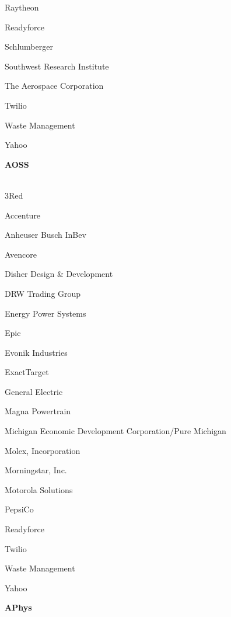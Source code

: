 \documentclass[twoside]{article}
\begin{document}
\begin{center}
\begin{multicols}{5}
\begin{FlushLeft}
\begin{compactitem}
\item Raytheon
\item Readyforce
\item Schlumberger
\item Southwest Research Institute
\item The Aerospace Corporation
\item Twilio
\item Waste Management
\item Yahoo
\end{compactitem}
        \end{FlushLeft}
        \vspace{1em}
        {\fontsize{14}{16}\selectfont \bf AOSS}\\
        \vspace{-1em}
        ~\hrulefill~
        \vspace{-.9em}
        \begin{FlushLeft}
        \begin{compactitem}
        \item 3Red
\item Accenture
\item Anheuser Busch InBev
\item Avencore
\item Disher Design \& Development
\item DRW Trading Group
\item Energy Power Systems
\item Epic
\item Evonik Industries
\item ExactTarget
\item General Electric
\item Magna Powertrain
\item Michigan Economic Development Corporation/Pure Michigan
\item Molex, Incorporation
\item Morningstar, Inc.
\item Motorola Solutions
\item PepsiCo
\item Readyforce
\item Twilio
\item Waste Management
\item Yahoo
\end{compactitem}
        \end{FlushLeft}
        \vspace{1em}
        {\fontsize{14}{16}\selectfont \bf APhys}\\

\end{multicols}
\end{center}
\end{document}
